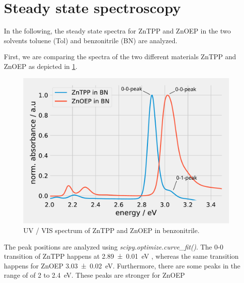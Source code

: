 \section{Steady state spectroscopy}
\label{sec:SSS}

In the following, the steady state spectra for ZnTPP and ZnOEP in the two solvents toluene (Tol) and benzonitrile (BN) are analyzed.

First, we are comparing the spectra of the two different materials ZnTPP and ZnOEP as depicted in \cref{fig:ZnTPPZnOEP}.
\begin{figure}[h]
    \centering
    \includegraphics[width = 12cm]{Program/ZnTPPZnOEP.pdf}
    \caption{UV / VIS spectrum of ZnTPP and ZnOEP in benzonitrile.}
    \label{fig:ZnTPPZnOEP}
\end{figure}
The peak positions are analyzed using \textit{scipy.optimize.curve\_fit()}. The 0-0 transition of ZnTPP happens at 
\SI{2.89 \pm 0.01}{\eV} , whereas the same transition happens for ZnOEP \SI{3.03\pm 0.02}{\eV}. Furthermore, there are some peaks in the
range of of 2 to \SI{2.4}{\eV}. These peaks are stronger for ZnOEP

